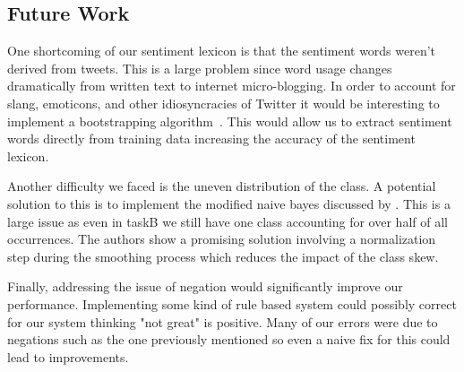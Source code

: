 \documentclass[11pt]{article}
\begin{document}
\subsection{Future Work}
One shortcoming of our sentiment lexicon is that the sentiment words weren't derived from tweets. This is a large problem since word usage changes dramatically from written text to internet micro-blogging. In order to account for slang, emoticons, and other idiosyncracies of Twitter it would be interesting to implement a bootstrapping algorithm~\cite{Riloffbootstrapping}. This would allow us to extract sentiment words directly from training data increasing the accuracy of the sentiment lexicon.

Another difficulty we faced is the uneven distribution of the class. A potential solution to this is to implement the modified naive bayes discussed by \cite{FranknaiveBayes}. This is a large issue as even in taskB we still have one class accounting for over half of all occurrences. The authors show a promising solution involving a normalization step during the smoothing process which reduces the impact of the class skew.

Finally, addressing the issue of negation would significantly improve our performance. Implementing some kind of rule based system could possibly correct for our system thinking "not great" is positive. Many of our errors were due to negations such as the one previously mentioned so even a naive fix for this could lead to improvements.



\end{document}
